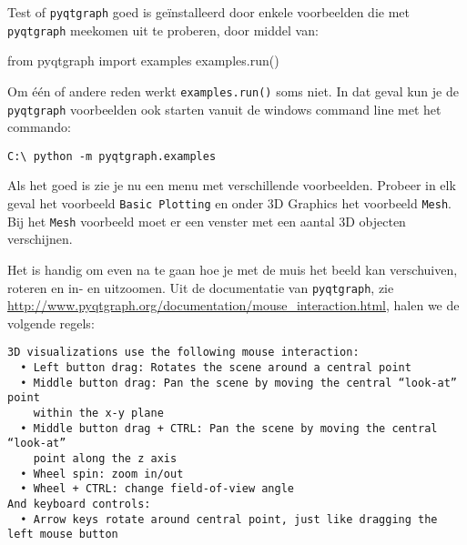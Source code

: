 \documentclass[a4paper,11pt]{article}
\begin{document}
Test of \texttt{pyqtgraph} goed is ge\"installeerd door enkele voorbeelden die met \texttt{pyqtgraph} meekomen uit te proberen, door middel van:
\begin{pyconsole}
from pyqtgraph import examples
examples.run()

\end{pyconsole}
Om \'e\'en of andere reden werkt \texttt{examples.run()} soms niet. In dat
geval kun je de \texttt{pyqtgraph} voorbeelden ook starten vanuit de windows
command line met het commando:
\begin{verbatim}
C:\ python -m pyqtgraph.examples
\end{verbatim}
Als het goed is zie je nu een menu met verschillende voorbeelden. Probeer in elk geval het voorbeeld \texttt{Basic Plotting} en onder 3D Graphics het voorbeeld \texttt{Mesh}. Bij het \texttt{Mesh} voorbeeld moet er een venster met een aantal 3D objecten verschijnen.

Het is handig om even na te gaan hoe je met de muis het beeld kan verschuiven, roteren en in- en uitzoomen. Uit de documentatie van \texttt{pyqtgraph}, zie \url{http://www.pyqtgraph.org/documentation/mouse_interaction.html}, halen we de volgende regels: 
\begin{verbatim}
3D visualizations use the following mouse interaction:
  • Left button drag: Rotates the scene around a central point
  • Middle button drag: Pan the scene by moving the central “look-at” point
    within the x-y plane
  • Middle button drag + CTRL: Pan the scene by moving the central “look-at”
    point along the z axis
  • Wheel spin: zoom in/out
  • Wheel + CTRL: change field-of-view angle
And keyboard controls:
  • Arrow keys rotate around central point, just like dragging the left mouse button
\end{verbatim}
\end{document}
